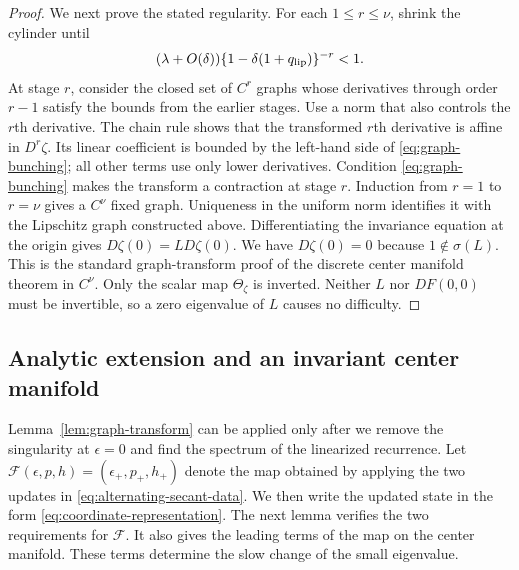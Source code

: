 \documentclass[11pt]{article}
\begin{document}
\begin{proof}
We next prove the stated regularity.  For each
$1\le r\le\nu$, shrink the cylinder until
\begin{equation}\label{eq:graph-bunching}
(\lambda+O(\delta))
\{1-\delta(1+q_{\rm lip})\}^{-r}<1.
\end{equation}
At stage $r$, consider the closed set of $C^r$ graphs whose derivatives through
order $r-1$ satisfy the bounds from the earlier stages.  Use a norm that also
controls the $r$th derivative.  The chain rule shows that the transformed
$r$th derivative is affine in $D^r\zeta$.  Its linear coefficient is bounded
by the left-hand side of \eqref{eq:graph-bunching}; all other terms use only
lower derivatives.  Condition \eqref{eq:graph-bunching} makes the transform a
contraction at stage $r$.  Induction from $r=1$ to $r=\nu$ gives a $C^\nu$
fixed graph.  Uniqueness in the uniform norm identifies it with the Lipschitz
graph constructed above.  Differentiating the invariance equation at the
origin gives $D\zeta(0)=L D\zeta(0)$.  We have $D\zeta(0)=0$ because
$1\notin\sigma(L)$.  This is the standard graph-transform proof of the
discrete center manifold theorem in $C^\nu$.  Only the scalar map
$\Theta_\zeta$ is inverted.  Neither $L$ nor $DF(0,0)$ must be invertible, so
a zero eigenvalue of $L$ causes no difficulty.
\end{proof}

\subsection{Analytic extension and an invariant center manifold}

Lemma~\ref{lem:graph-transform} can be applied only after we remove the
singularity at $\epsilon=0$ and find the spectrum of the linearized recurrence.
Let
$\mathcal F(\epsilon,p,h)=(\epsilon_+,p_+,h_+)$ denote the map obtained by
applying the two updates in \eqref{eq:alternating-secant-data}.  We then write
the updated state in the form \eqref{eq:coordinate-representation}.  The next
lemma verifies the two requirements for $\mathcal F$.  It also gives the
leading terms of the map on the center manifold.  These terms determine the
slow change of the small eigenvalue.
\end{document}
